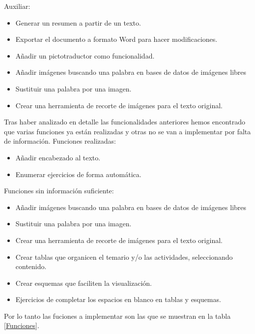Auxiliar:
\begin{itemize}
  \item Generar un resumen a partir de un texto.
  \item Exportar el documento a formato Word para hacer modificaciones.
  \item Añadir un pictotraductor como funcionalidad.
  \item Añadir imágenes buscando una palabra en bases de datos de imágenes libres
  \item Sustituir una palabra por una imagen.
  \item Crear una herramienta de recorte de imágenes para el texto original.
\end{itemize}
Tras haber analizado en detalle las  funcionalidades anteriores hemos encontrado que varias funciones ya están realizadas y otras no se van a implementar por falta de información.
Funciones realizadas:
\begin{itemize}
  \item Añadir encabezado al texto.
  \item Enumerar ejercicios de forma automática.
\end{itemize}
Funciones sin información suficiente:
\begin{itemize}
  \item Añadir imágenes buscando una palabra en bases de datos de imágenes libres
  \item Sustituir una palabra por una imagen.
  \item Crear una herramienta de recorte de imágenes para el texto original.
  \item Crear tablas que organicen el temario y/o las actividades, seleccionando contenido.
  \item Crear esquemas que faciliten la visualización.
  \item Ejercicios de completar los espacios en blanco en tablas y esquemas.
\end{itemize}
Por lo tanto las fuciones a implementar son las que se muestran en la tabla \ref{Funciones}.
